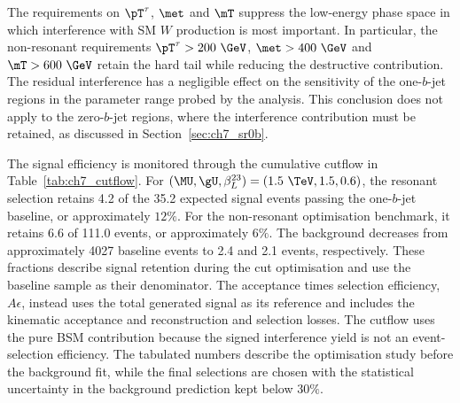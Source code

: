 The requirements on $\pT^\tau$, $\met$ and $\mT$ suppress the low-energy phase space in which interference with SM $W$ production is most important.
In particular, the non-resonant requirements $\pT^\tau>200~\GeV$, $\met>400~\GeV$ and $\mT>600~\GeV$ retain the hard tail while reducing the destructive contribution.
The residual interference has a negligible effect on the sensitivity of the one-$b$-jet regions in the parameter range probed by the analysis.
This conclusion does not apply to the zero-$b$-jet regions, where the interference contribution must be retained, as discussed in Section~\ref{sec:ch7_sr0b}.

The signal efficiency is monitored through the cumulative cutflow in Table~\ref{tab:ch7_cutflow}.
For $(\MU,\gU,\beta_L^{23})=(1.5~\TeV,1.5,0.6)$, the resonant selection retains 4.2 of the 35.2 expected signal events passing the one-$b$-jet baseline, or approximately $12\%$.
For the non-resonant optimisation benchmark, it retains 6.6 of 111.0 events, or approximately $6\%$.
The background decreases from approximately 4027 baseline events to 2.4 and 2.1 events, respectively.
These fractions describe signal retention during the cut optimisation and use the baseline sample as their denominator.
The acceptance times selection efficiency, $A\epsilon$, instead uses the total generated signal as its reference and includes the kinematic acceptance and reconstruction and selection losses.
The cutflow uses the pure BSM contribution because the signed interference yield is not an event-selection efficiency.
The tabulated numbers describe the optimisation study before the background fit, while the final selections are chosen with the statistical uncertainty in the background prediction kept below $30\%$.

